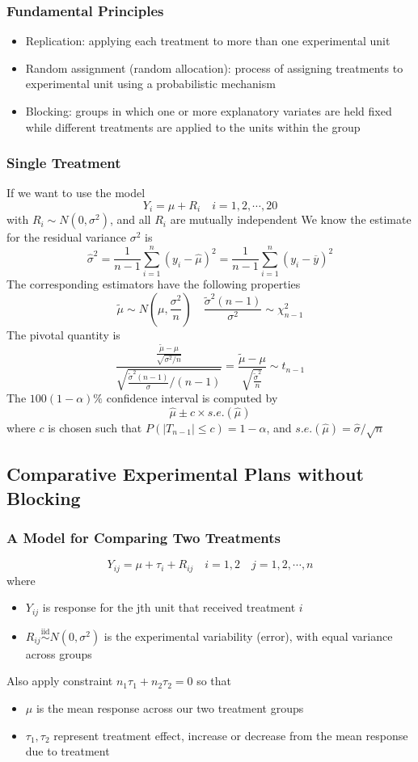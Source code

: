 \documentclass[11pt]{article}
\begin{document}
\subsubsection{Fundamental Principles}
\begin{itemize}
    \item Replication: applying each treatment to more than one experimental unit 
    \item Random assignment (random allocation): process of assigning treatments to experimental unit using a probabilistic mechanism
    \item Blocking: groups in which one or more explanatory variates are held fixed while different treatments are applied to the units within the group 
\end{itemize}
\subsubsection{Single Treatment}
If we want to use the model
\[Y_i = \mu+R_i\quad i=1,2,\cdots,20\]
with $R_i\sim N(0,\sigma^2)$, and all $R_i$ are mutually independent 
We know the estimate for the residual variance $\sigma^2$ is 
\[\hat{\sigma}^2 = \frac{1}{n-1}\sum_{i=1}^{n}(y_i-\hat\mu)^2 = \frac{1}{n-1}\sum_{i=1}^{n}(y_i-\overline{y})^2\]
The corresponding estimators have the following properties 
\[\tilde{\mu}\sim N(\mu, \frac{\sigma^2}{n})\quad \frac{\tilde{\sigma}^2(n-1)}{\sigma^2}\sim\chi^2_{n-1}\]
The pivotal quantity is 
\[\frac{\frac{\tilde{\mu}-\mu}{\sqrt{\sigma^2/n}}}{\sqrt{\frac{\tilde{\sigma}^2(n-1)}{\sigma}/(n-1)}} = \frac{\tilde{\mu}-\mu}{\sqrt{\frac{\tilde{\sigma}^2}{n}}}\sim t_{n-1}\]
The $100(1-\alpha)\%$ confidence interval is computed by 
\[\hat\mu\pm c\times s.e.(\hat\mu)\]
where $c$ is chosen such that $P(|T_{n-1}|\leq c)=1-\alpha$, and $s.e.(\hat\mu) = \hat\sigma / \sqrt{n}$
\subsection{Comparative Experimental Plans without Blocking}
\subsubsection{A Model for Comparing Two Treatments}
\[Y_{ij}=\mu+\tau_i+R_{ij}\quad i=1,2\quad j=1,2,\cdots,n\]
where
\begin{itemize}
    \item $Y_{ij}$ is response for the jth unit that received treatment $i$
    \item $R_{ij}\overset{\text{iid}}{\sim} N(0,\sigma^2)$ is the experimental variability (error), with equal variance across groups 
\end{itemize}
Also apply constraint $n_1\tau_1+n_2\tau_2=0$ so that 
\begin{itemize}
    \item $\mu$ is the mean response across our two treatment groups 
    \item $\tau_1,\tau_2$ represent treatment effect, increase or decrease from the mean response due to treatment 
\end{itemize}
\end{document}
